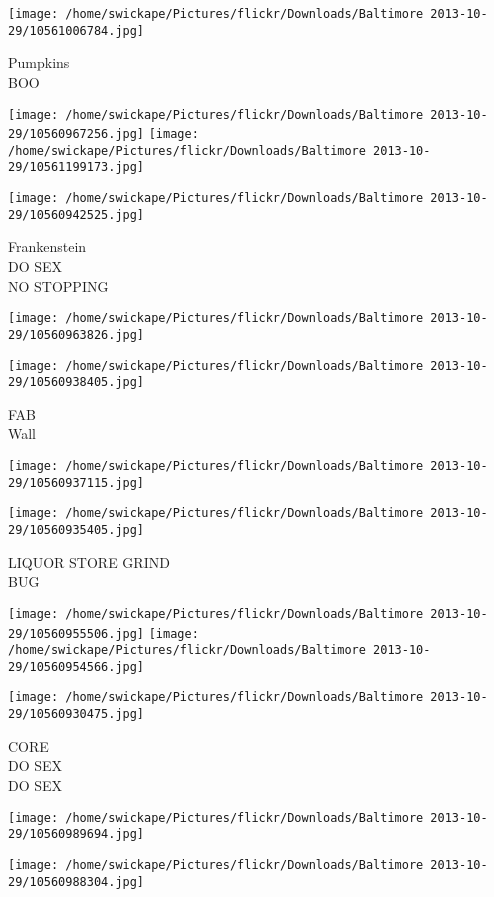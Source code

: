 \documentclass[10pt,letterpaper]{article}
\begin{document}
\vspace{0.25in}
\texttt{[image: /home/swickape/Pictures/flickr/Downloads/Baltimore 2013-10-29/10561006784.jpg]}

Pumpkins\\
BOO
\pagebreak

\texttt{[image: /home/swickape/Pictures/flickr/Downloads/Baltimore 2013-10-29/10560967256.jpg]}
\texttt{[image: /home/swickape/Pictures/flickr/Downloads/Baltimore 2013-10-29/10561199173.jpg]}

\texttt{[image: /home/swickape/Pictures/flickr/Downloads/Baltimore 2013-10-29/10560942525.jpg]}

Frankenstein\\
DO SEX\\
NO STOPPING
\pagebreak

\texttt{[image: /home/swickape/Pictures/flickr/Downloads/Baltimore 2013-10-29/10560963826.jpg]}

\vspace{0.25in}
\texttt{[image: /home/swickape/Pictures/flickr/Downloads/Baltimore 2013-10-29/10560938405.jpg]}

FAB\\
Wall
\pagebreak

\texttt{[image: /home/swickape/Pictures/flickr/Downloads/Baltimore 2013-10-29/10560937115.jpg]}

\vspace{0.25in}
\texttt{[image: /home/swickape/Pictures/flickr/Downloads/Baltimore 2013-10-29/10560935405.jpg]}

LIQUOR STORE GRIND\\
BUG
\pagebreak

\texttt{[image: /home/swickape/Pictures/flickr/Downloads/Baltimore 2013-10-29/10560955506.jpg]}
\texttt{[image: /home/swickape/Pictures/flickr/Downloads/Baltimore 2013-10-29/10560954566.jpg]}

\texttt{[image: /home/swickape/Pictures/flickr/Downloads/Baltimore 2013-10-29/10560930475.jpg]}

CORE\\
DO SEX\\
DO SEX
\pagebreak

\texttt{[image: /home/swickape/Pictures/flickr/Downloads/Baltimore 2013-10-29/10560989694.jpg]}

\vspace{0.25in}
\texttt{[image: /home/swickape/Pictures/flickr/Downloads/Baltimore 2013-10-29/10560988304.jpg]}
\end{document}
